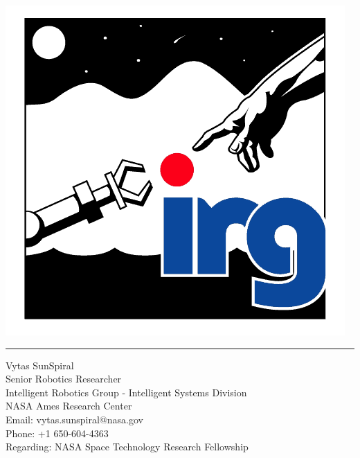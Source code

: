 \documentclass[12pt]{letter} %
\begin{document}
\longindentation=0pt                       %
\let\raggedleft\raggedright                %

\begin{letter}{}

\begin{minipage}[b]{0.3\linewidth}
\includegraphics[scale=0.2]{irglogo.png}
\end{minipage}

\medskip\hrule height 1pt
\begin{flushright}
\hfill Vytas SunSpiral\\
\hfill Senior Robotics Researcher \\
\hfill Intelligent Robotics Group - Intelligent Systems Division \\
\hfill NASA Ames Research Center \\
\hfill Email:  vytas.sunspiral@nasa.gov\\
\hfill Phone:  +1 650-604-4363 \\
\vspace{0.5cm}
\hfill Regarding: NASA Space Technology Research Fellowship
\end{flushright}


\end{letter}
\end{document}

